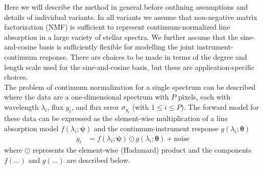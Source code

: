\documentclass[modern]{aastex631}
\newcommand{\vectheta}{\boldsymbol{\theta}}
\newcommand{\vecpsi}{\boldsymbol{\psi}}
\newcommand{\hadamard}{\odot}
\begin{document}
Here we will describe the method in general before outlining assumptions and details of individual variants. In all variants we assume that non-negative matrix factorization (NMF) is sufficient to represent continuum-normalized line absorption in a large variety of stellar spectra. We further assume that the sine-and-cosine basis is sufficiently flexible for modelling the joint instrument-continuum response. There are choices to be made in terms of the degree and length scale used for the sine-and-cosine basis, but these are application-specific choices.\\


The problem of continuum normalization for a single spectrum can be described where the data are a one-dimensional spectrum with $P$ pixels, each with wavelength $\lambda_i$, flux $y_i$, and flux error $\sigma_{y_i}$ (with $1 \leq i \leq P$). The forward model for these data can be expressed as the element-wise multiplication of a line absorption model $f(\lambda_i; \vecpsi)$ and the continuum-instrument response $g(\lambda_i;\vectheta)$
\begin{align}
    y_i &= f(\lambda_i;\vecpsi)\hadamard{}g(\lambda_i;\vectheta) + \mbox{noise}
\end{align}
where $\hadamard$ represents the element-wise (Hadamard) product and the components $f(...)$ and $g(...)$ are described below.\\
\end{document}
